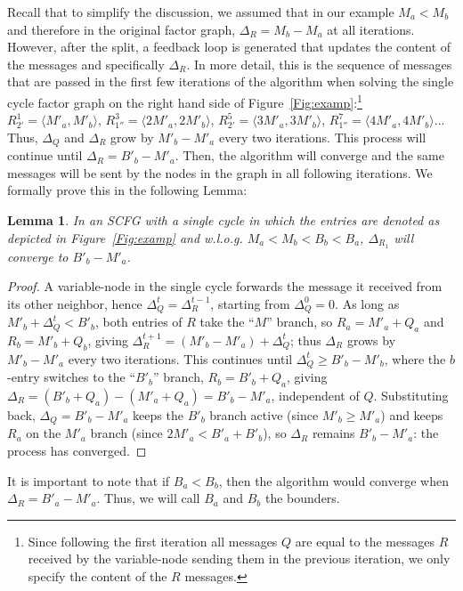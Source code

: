 \documentclass[letterpaper]{article} %
\newtheorem{lemma}[theorem]{Lemma}
\theoremstyle{definition}
\theoremstyle{remark}
\begin{document}
Recall that to simplify the discussion, we assumed that in our example $M_a < M_b$ and therefore in the original factor graph, $\Delta_R = M_b - M_a$ at all iterations.
However, after the split, a feedback loop is generated that updates the content of the messages and specifically $\Delta_R$.
In more detail, this is the sequence of messages that are passed in the first few iterations of the algorithm when solving the single cycle factor graph on the right hand side of Figure~\ref{Fig:examp}:\footnote{Since following the first iteration all messages $Q$ are equal to the messages $R$ received by the variable-node sending them in the previous iteration, we only specify the content of the $R$ messages.} $R^1_{2'} = \langle M'_a,M'_b\rangle$, $R^3_{1''} = \langle 2M'_a,2M'_b\rangle$, $R^5_{2'} = \langle 3M'_a,3M'_b\rangle$,  $R^7_{1''} = \langle 4M'_a,4M'_b\rangle$...
Thus, $\Delta_Q$ and $\Delta_R$ grow by $M'_b - M'_a$ every two iterations. This process will continue until $\Delta_R = B'_b - M'_a$. Then, the algorithm will converge and the same messages will be sent by the nodes in the graph in all following iterations. We formally prove this in the following Lemma:
\begin{lemma}\label{lem:singlecycle}
    In an SCFG with a single cycle in which the entries are denoted as depicted in Figure~\ref{Fig:examp} and w.l.o.g. $M_a < M_b < B_b < B_a$, $\Delta_{R_1}$ will converge to $B'_b - M'_a$.
\end{lemma}
\begin{proof}
    A variable-node in the single cycle forwards the message it received from its other neighbor, hence $\Delta^{t}_Q = \Delta^{t-1}_R$, starting from $\Delta^0_Q = 0$. As long as $M'_b + \Delta^t_Q < B'_b$, both entries of $R$ take the ``$M$'' branch, so $R_a = M'_a + Q_a$ and $R_b = M'_b + Q_b$, giving $\Delta^{t+1}_R = (M'_b - M'_a) + \Delta^t_Q$; thus $\Delta_R$ grows by $M'_b - M'_a$ every two iterations. This continues until $\Delta^t_Q \geq B'_b - M'_b$, where the $b$-entry switches to the ``$B'_b$'' branch, $R_b = B'_b + Q_a$, giving $\Delta_R = (B'_b + Q_a) - (M'_a + Q_a) = B'_b - M'_a$, independent of $Q$. Substituting back, $\Delta_Q = B'_b - M'_a$ keeps the $B'_b$ branch active (since $M'_b \geq M'_a$) and keeps $R_a$ on the $M'_a$ branch (since $2M'_a < B'_a + B'_b$), so $\Delta_R$ remains $B'_b - M'_a$: the process has converged.
\end{proof}
It is important to note that if $B_a < B_b$, then the algorithm would converge when $\Delta_R = B'_a - M'_a$. Thus, we will call $B_a$ and $B_b$ the bounders.
\end{document}
